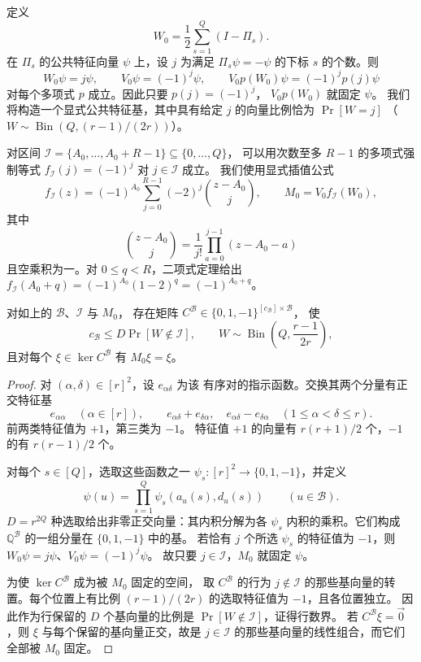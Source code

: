 定义
\begin{equation}\label{eq:swap-weight}
 W_0=\frac12\sum_{s=1}^Q(I-\Pi_s).
\end{equation}
在 $\Pi_s$ 的公共特征向量 $\psi$ 上，设 $j$ 为满足
$\Pi_s\psi=-\psi$ 的下标 $s$ 的个数。则
\[
 W_0\psi=j\psi,\qquad V_0\psi=(-1)^j\psi,
 \qquad V_0p(W_0)\psi=(-1)^jp(j)\psi
\]
对每个多项式 $p$ 成立。因此只要 $p(j)=(-1)^j$，
$V_0p(W_0)$ 就固定 $\psi$。
我们将构造一个显式公共特征基，其中具有给定 $j$
的向量比例恰为 $\Pr[W=j]$
（$W\sim\operatorname{Bin}(Q,(r-1)/(2r))$）。

对区间
$\mathcal I=\{A_0,\ldots,A_0+R-1\}\subseteq\{0,\ldots,Q\}$，
可以用次数至多 $R-1$ 的多项式强制等式
$f_{\mathcal I}(j)=(-1)^j$ 对 $j\in\mathcal I$ 成立。
我们使用显式插值公式
\begin{equation}\label{eq:swap-matrix-definition}
 f_{\mathcal I}(z)=(-1)^{A_0}\sum_{j=0}^{R-1}(-2)^j
                         \binom{z-A_0}{j},
 \qquad M_0=V_0f_{\mathcal I}(W_0),
\end{equation}
其中
\[
 \binom{z-A_0}{j}=\frac1{j!}\prod_{a=0}^{j-1}(z-A_0-a)
\]
且空乘积为一。对 $0\le q<R$，二项式定理给出
$f_{\mathcal I}(A_0+q)=(-1)^{A_0}(1-2)^q=(-1)^{A_0+q}$。

\begin{lemma}\label{lem:swaps-matrix}
对如上的 $\mathcal B$、$\mathcal I$ 与 $M_0$，
存在矩阵 $C^{\mathcal B}\in\{0,1,-1\}^{[c_{\mathcal B}]\times\mathcal B}$，
使
\[
 c_{\mathcal B}\le D\Pr[W\notin\mathcal I],\qquad
 W\sim\operatorname{Bin}\!\left(Q,\frac{r-1}{2r}\right),
\]
且对每个 $\xi\in\ker C^{\mathcal B}$ 有
$M_0\xi=\xi$。
\end{lemma}
\begin{proof}
对 $(\alpha,\delta)\in[r]^2$，设 $e_{\alpha\delta}$ 为该
有序对的指示函数。交换其两个分量有正交特征基
\[
 e_{\alpha\alpha}\quad(\alpha\in[r]),\qquad
 e_{\alpha\delta}+e_{\delta\alpha},\quad
 e_{\alpha\delta}-e_{\delta\alpha}\quad(1\le\alpha<\delta\le r).
\]
前两类特征值为 $+1$，第三类为 $-1$。
特征值 $+1$ 的向量有 $r(r+1)/2$ 个，$-1$ 的有
$r(r-1)/2$ 个。

对每个 $s\in[Q]$，选取这些函数之一
$\psi_s:[r]^2\to\{0,1,-1\}$，并定义
\[
 \psi(u)=\prod_{s=1}^Q\psi_s(a_u(s),d_u(s))
 \qquad(u\in\mathcal B).
\]
$D=r^{2Q}$ 种选取给出非零正交向量：其内积分解为各
$\psi_s$ 内积的乘积。它们构成 $\mathbb Q^{\mathcal B}$
的一组分量在 $\{0,1,-1\}$ 中的基。
若恰有 $j$ 个所选 $\psi_s$ 的特征值为 $-1$，则
$W_0\psi=j\psi$、$V_0\psi=(-1)^j\psi$。
故只要 $j\in\mathcal I$，$M_0$ 就固定 $\psi$。

为使 $\ker C^{\mathcal B}$ 成为被 $M_0$ 固定的空间，
取 $C^{\mathcal B}$ 的行为 $j\notin\mathcal I$
的那些基向量的转置。每个位置上有比例 $(r-1)/(2r)$
的选取特征值为 $-1$，且各位置独立。
因此作为行保留的 $D$ 个基向量的比例是
$\Pr[W\notin\mathcal I]$，证得行数界。
若 $C^{\mathcal B}\xi=\vec{0}$，则 $\xi$
与每个保留的基向量正交，故是 $j\in\mathcal I$
的那些基向量的线性组合，而它们全部被 $M_0$ 固定。
\end{proof}

